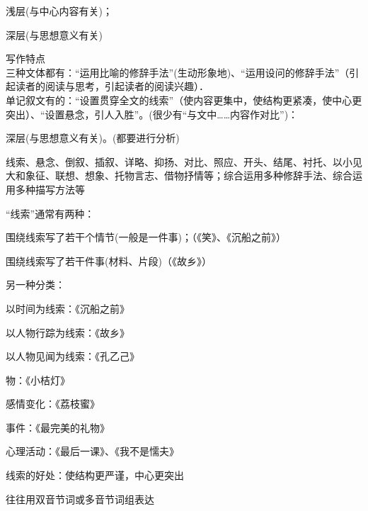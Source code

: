 {
\begin{asparaenum}[(1)]
\item 浅层(与中心内容有关)；
\item 深层(与思想意义有关)
\end{asparaenum}

\begin{asparaenum}[(1)]
\item 写作特点\\
三种文体都有：``运用比喻的修辞手法''(生动形象地)、``运用设问的修辞手法''（引起读者的阅读与思考，引起读者的阅读兴趣）．\\
单记叙文有的：``设置贯穿全文的线索''（使内容更集中，使结构更紧凑，使中心更突出）、``设置悬念，引人入胜''。(很少有``与文中\ldots{}\ldots{}内容作对比'')：\\
\item 深层(与思想意义有关)。(都要进行分析)
\end{asparaenum}

线索、悬念、倒叙、插叙、详略、抑扬、对比、照应、开头、结尾、衬托、以小见大和象征、联想、想象、托物言志、借物抒情等；综合运用多种修辞手法、综合运用多种描写方法等\par
``线索''通常有两种：\begin{asparaenum}[(1)]\item 围绕线索写了若干个情节(一般是一件事)；（《笑》、《沉船之前》）
                      \item 围绕线索写了若干件事(材料、片段)（《故乡》）\end{asparaenum}

另一种分类：\begin{asparaenum}[(1)]\item 以时间为线索：《沉船之前》
              \item 以人物行踪为线索：《故乡》
              \item 以人物见闻为线索：《孔乙己》
              \item 物：《小桔灯》
              \item 感情变化：《荔枝蜜》
              \item 事件：《最完美的礼物》
              \item 心理活动：《最后一课》、《我不是懦夫》\end{asparaenum}

线索的好处：使结构更严谨，中心更突出

  往往用双音节词或多音节词组表达

}
